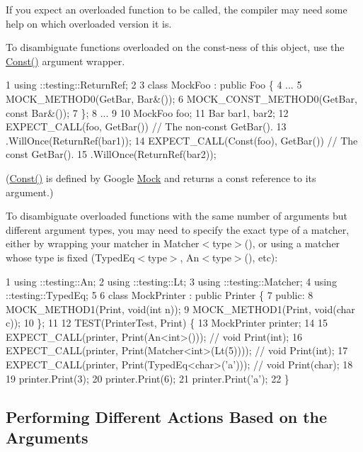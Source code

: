 If you expect an overloaded function to be called, the compiler may need some help on which overloaded version it is.

To disambiguate functions overloaded on the const-\/ness of this object, use the {\ttfamily \hyperlink{namespacetesting_a945ac56c5508a3c9c032bbe8aae8dcfa}{Const()}} argument wrapper.


\begin{DoxyCode}
1 using ::testing::ReturnRef;
2 
3 class MockFoo : public Foo \{
4   ...
5   MOCK\_METHOD0(GetBar, Bar&());
6   MOCK\_CONST\_METHOD0(GetBar, const Bar&());
7 \};
8 ...
9 
10   MockFoo foo;
11   Bar bar1, bar2;
12   EXPECT\_CALL(foo, GetBar())         // The non-const GetBar().
13       .WillOnce(ReturnRef(bar1));
14   EXPECT\_CALL(Const(foo), GetBar())  // The const GetBar().
15       .WillOnce(ReturnRef(bar2));
\end{DoxyCode}


({\ttfamily \hyperlink{namespacetesting_a945ac56c5508a3c9c032bbe8aae8dcfa}{Const()}} is defined by Google \hyperlink{class_mock}{Mock} and returns a {\ttfamily const} reference to its argument.)

To disambiguate overloaded functions with the same number of arguments but different argument types, you may need to specify the exact type of a matcher, either by wrapping your matcher in {\ttfamily Matcher$<$type$>$()}, or using a matcher whose type is fixed ({\ttfamily Typed\+Eq$<$type$>$}, {\ttfamily An$<$type$>$()}, etc)\+:


\begin{DoxyCode}
1 using ::testing::An;
2 using ::testing::Lt;
3 using ::testing::Matcher;
4 using ::testing::TypedEq;
5 
6 class MockPrinter : public Printer \{
7  public:
8   MOCK\_METHOD1(Print, void(int n));
9   MOCK\_METHOD1(Print, void(char c));
10 \};
11 
12 TEST(PrinterTest, Print) \{
13   MockPrinter printer;
14 
15   EXPECT\_CALL(printer, Print(An<int>()));            // void Print(int);
16   EXPECT\_CALL(printer, Print(Matcher<int>(Lt(5))));  // void Print(int);
17   EXPECT\_CALL(printer, Print(TypedEq<char>('a')));   // void Print(char);
18 
19   printer.Print(3);
20   printer.Print(6);
21   printer.Print('a');
22 \}
\end{DoxyCode}


\subsection*{Performing Different Actions Based on the Arguments}

